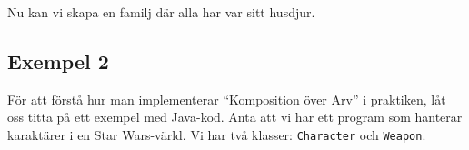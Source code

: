 \begin{Shaded}
\begin{Highlighting}[]
    \OperatorTok{()\{} \OperatorTok{;} \OperatorTok{\}}
    \OperatorTok{()\{} \OperatorTok{;} \OperatorTok{\}}
    \OperatorTok{()\{} \OperatorTok{;} \OperatorTok{\}}
    \OperatorTok{[]} \OperatorTok{()\{} \OperatorTok{;} \OperatorTok{\}}
      \OperatorTok{(}\OperatorTok{)\{}  \OperatorTok{=}\OperatorTok{;} \OperatorTok{\}}
      \OperatorTok{(}\OperatorTok{)\{}  \OperatorTok{=}\OperatorTok{;} \OperatorTok{\}}
      \OperatorTok{(}\OperatorTok{)\{}  \OperatorTok{=}\OperatorTok{;} \OperatorTok{\}}
      \OperatorTok{(}\OperatorTok{[]}\OperatorTok{)\{}  \OperatorTok{=}\OperatorTok{;} \OperatorTok{\}}
\OperatorTok{\}}
\end{Highlighting}
\end{Shaded}

Nu kan vi skapa en familj där alla har var sitt husdjur.

\hypertarget{exempel-2}{%
\subsection{Exempel 2}\label{exempel-2}}

För att förstå hur man implementerar ``Komposition över Arv'' i
praktiken, låt oss titta på ett exempel med Java-kod. Anta att vi har
ett program som hanterar karaktärer i en Star Wars-värld. Vi har två
klasser: \texttt{Character} och \texttt{Weapon}.

